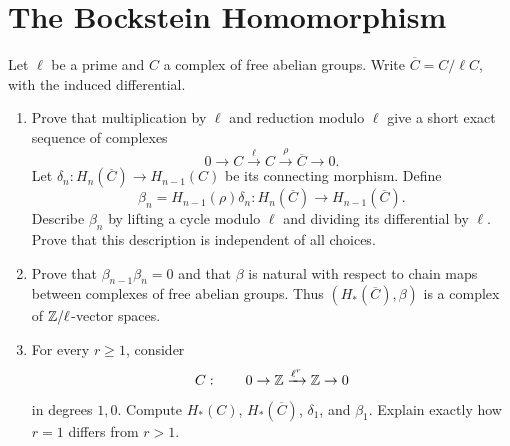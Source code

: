 \documentclass[11pt]{article}
\begin{document}
\section{The Bockstein Homomorphism}\label{ex:bockstein}
Let $\ell$ be a prime and $C$ a complex of free abelian groups. Write $\overline C=C/\ell C$, with the induced differential.
\begin{enumerate}
\item Prove that multiplication by $\ell$ and reduction modulo $\ell$ give a short exact sequence of complexes
\[
0\to C\xrightarrow{\ell}C\xrightarrow{\rho}\overline C\to0.
\]
Let $\delta_n:H_n(\overline C)\to H_{n-1}(C)$ be its connecting morphism. Define
\[
\beta_n=H_{n-1}(\rho)\delta_n:
H_n(\overline C)\to H_{n-1}(\overline C).
\]
Describe $\beta_n$ by lifting a cycle modulo $\ell$ and dividing its differential by $\ell$. Prove that this description is independent of all choices.
\item Prove that $\beta_{n-1}\beta_n=0$ and that $\beta$ is natural with respect to chain maps between complexes of free abelian groups. Thus $(H_*(\overline C),\beta)$ is a complex of $\mathbb Z/\ell$-vector spaces.
\item For every $r\geq1$, consider
\[
C:\qquad 0\to\mathbb Z\xrightarrow{\ell^r}\mathbb Z\to0
\]
in degrees $1,0$. Compute $H_*(C)$, $H_*(\overline C)$, $\delta_1$, and $\beta_1$. Explain exactly how $r=1$ differs from $r>1$.
\end{enumerate}
\end{document}
